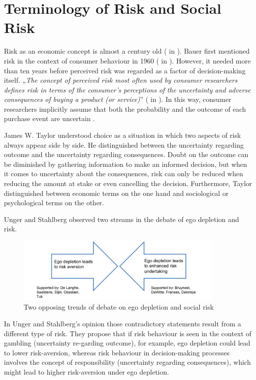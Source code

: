 \section{Terminology of Risk and Social Risk}
Risk as an economic concept is almost a century old (\cite{knight1921risk} in \cite{dowling1994model}). Bauer first mentioned risk in the context of consumer behaviour in 1960 (\cite{bauer1960consumer} in \cite{ross1975perceived}). However, it needed more than ten years before perceived risk was regarded as a factor of decision-making itself. „\emph{The concept of perceived risk most often used by consumer researchers defines risk in terms of the consumer's perceptions of the uncertainty and adverse consequences of buying a product (or service)}” (\cite{engel1973blackwell} in \cite{ross1975perceived}). In this way, consumer researchers implicitly assume that both the probability and the outcome of each purchase event are uncertain \citep{dowling1994model}.\par
James W. Taylor \citep{taylor1974role} understood choice as a situation in which two aspects of risk always appear side by side. He distinguished between the uncertainty regarding outcome and the uncertainty regarding consequences. Doubt on the outcome can be diminished by gathering information to make an informed decision, but when it comes to uncertainty about the consequences, risk can only be reduced when reducing the amount at stake or even cancelling the decision. Furthermore, Taylor distinguished between economic terms on the one hand and sociological or psychological terms on the other.\par
Unger and Stahlberg \citep{unger2011ego} observed two streams in the debate of ego depletion and risk. 
\begin{figure}[h!]
	\includegraphics[width=0.9\textwidth]{images/twostreams.png}
  \caption{Two opposing trends of debate on ego depletion and social risk \citep{unger2011ego}} \label{fig:twostreams}
\end{figure}
In Unger and Stahlberg’s opinion those contradictory statements result from a different type of risk. They propose that if risk behaviour is seen in the context of gambling (uncertainty re-garding outcome), for example, ego depletion could lead to lower risk-aversion, whereas risk behaviour in decision-making processes involves the concept of responsibility (uncertainty regarding consequences), which might lead to higher risk-aversion under ego depletion. \par
